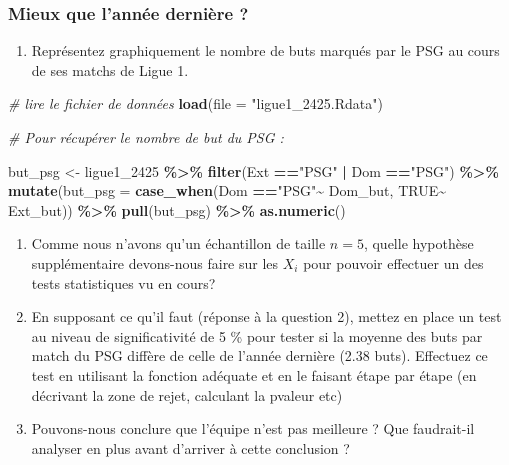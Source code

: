 \documentclass[
]{article}
\newenvironment{Shaded}{\begin{snugshade}}{\end{snugshade}}
\newcommand{\AttributeTok}[1]{\textcolor[rgb]{0.13,0.29,0.53}{#1}}
\newcommand{\CommentTok}[1]{\textcolor[rgb]{0.56,0.35,0.01}{\textit{#1}}}
\newcommand{\ConstantTok}[1]{\textcolor[rgb]{0.56,0.35,0.01}{#1}}
\newcommand{\FunctionTok}[1]{\textcolor[rgb]{0.13,0.29,0.53}{\textbf{#1}}}
\newcommand{\NormalTok}[1]{#1}
\newcommand{\OtherTok}[1]{\textcolor[rgb]{0.56,0.35,0.01}{#1}}
\newcommand{\SpecialCharTok}[1]{\textcolor[rgb]{0.81,0.36,0.00}{\textbf{#1}}}
\newcommand{\StringTok}[1]{\textcolor[rgb]{0.31,0.60,0.02}{#1}}
\providecommand{\tightlist}{%
  \setlength{\itemsep}{0pt}\setlength{\parskip}{0pt}}
\begin{document}
\hypertarget{mieux-que-lannuxe9e-derniuxe8re}{%
\subsubsection{Mieux que l'année dernière
?}\label{mieux-que-lannuxe9e-derniuxe8re}}

\begin{enumerate}
\def\labelenumi{\arabic{enumi}.}
\tightlist
\item
  Représentez graphiquement le nombre de buts marqués par le PSG au
  cours de ses matchs de Ligue 1.
\end{enumerate}

\begin{Shaded}
\begin{Highlighting}[]
\CommentTok{\# lire le fichier de données}
\FunctionTok{load}\NormalTok{(}\AttributeTok{file =} \StringTok{"ligue1\_2425.Rdata"}\NormalTok{) }

\CommentTok{\# Pour récupérer le nombre de but du PSG : }

\NormalTok{but\_psg }\OtherTok{\textless{}{-}}\NormalTok{ ligue1\_2425 }\SpecialCharTok{\%\textgreater{}\%} 
  \FunctionTok{filter}\NormalTok{(Ext }\SpecialCharTok{==}\StringTok{"PSG"} \SpecialCharTok{|}\NormalTok{ Dom }\SpecialCharTok{==}\StringTok{"PSG"}\NormalTok{) }\SpecialCharTok{\%\textgreater{}\%} 
  \FunctionTok{mutate}\NormalTok{(}\AttributeTok{but\_psg =} \FunctionTok{case\_when}\NormalTok{(Dom }\SpecialCharTok{==}\StringTok{"PSG"}\SpecialCharTok{\textasciitilde{}}\NormalTok{ Dom\_but,}
                             \ConstantTok{TRUE}\SpecialCharTok{\textasciitilde{}}\NormalTok{ Ext\_but)) }\SpecialCharTok{\%\textgreater{}\%} 
  \FunctionTok{pull}\NormalTok{(but\_psg) }\SpecialCharTok{\%\textgreater{}\%} \FunctionTok{as.numeric}\NormalTok{()}
\end{Highlighting}
\end{Shaded}

\begin{enumerate}
\def\labelenumi{\arabic{enumi}.}
\setcounter{enumi}{1}
\item
  Comme nous n'avons qu'un échantillon de taille \(n = 5\), quelle
  hypothèse supplémentaire devons-nous faire sur les \(X_i\) pour
  pouvoir effectuer un des tests statistiques vu en cours?
\item
  En supposant ce qu'il faut (réponse à la question 2), mettez en place
  un test au niveau de significativité de 5 \% pour tester si la moyenne
  des buts par match du PSG diffère de celle de l'année dernière (2.38
  buts). Effectuez ce test en utilisant la fonction adéquate et en le
  faisant étape par étape (en décrivant la zone de rejet, calculant la
  pvaleur etc)
\item
  Pouvons-nous conclure que l'équipe n'est pas meilleure ? Que
  faudrait-il analyser en plus avant d'arriver à cette conclusion ?
\end{enumerate}
\end{document}

